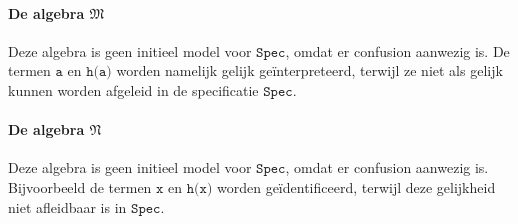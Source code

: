 \documentclass[a4paper,11pt]{article}
\begin{document}
\begin{description}
\paragraph{De algebra $\mathfrak{M}$}

Deze algebra is geen initieel model voor $\texttt{Spec}$, omdat er confusion
aanwezig is. De termen $\texttt{a}$ en $\texttt{h(a)}$ worden namelijk gelijk
ge\"interpreteerd, terwijl ze niet als gelijk kunnen worden afgeleid in de
specificatie $\texttt{Spec}$.

\paragraph{De algebra $\mathfrak{N}$}

Deze algebra is geen initieel model voor $\texttt{Spec}$, omdat er
confusion aanwezig is. Bijvoorbeeld de termen $\texttt{x}$ en $\texttt{h(x)}$
worden ge\"identificeerd, terwijl deze gelijkheid niet afleidbaar is in
$\texttt{Spec}$.

\end{description}
\end{document}
